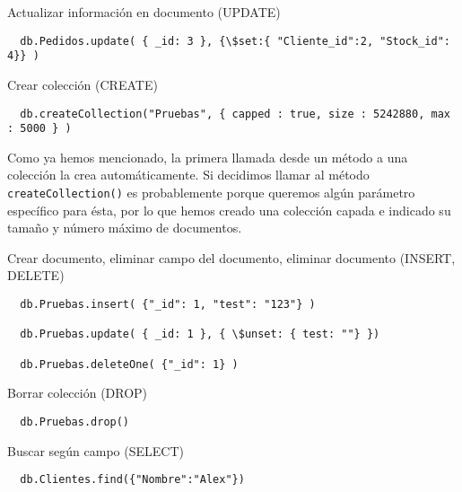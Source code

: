\pagebreak
\bigskip
{\large Actualizar información en documento (UPDATE)}

  \begin{lstlisting}
  db.Pedidos.update( { _id: 3 }, {\$set:{ "Cliente_id":2, "Stock_id": 4}} )
  \end{lstlisting}

\bigskip
{\large Crear colección (CREATE)}

  \begin{lstlisting}
  db.createCollection("Pruebas", { capped : true, size : 5242880, max : 5000 } )
  \end{lstlisting}

  Como ya hemos mencionado, la primera llamada desde un método a una colección la crea automáticamente. Si decidimos llamar al método \texttt{createCollection()} es probablemente porque queremos algún parámetro específico para ésta, por lo que hemos creado una colección capada e indicado su tamaño y número máximo de documentos.

\bigskip
{\large Crear documento, eliminar campo del documento, eliminar documento (INSERT, DELETE)}

  \begin{lstlisting}
  db.Pruebas.insert( {"_id": 1, "test": "123"} )

  db.Pruebas.update( { _id: 1 }, { \$unset: { test: ""} })

  db.Pruebas.deleteOne( {"_id": 1} )
  \end{lstlisting}

\bigskip
{\large Borrar colección (DROP)}

  \begin{lstlisting}
  db.Pruebas.drop()
  \end{lstlisting}

\bigskip
{\large Buscar según campo (SELECT)}

  \begin{lstlisting}
  db.Clientes.find({"Nombre":"Alex"})
  \end{lstlisting}
